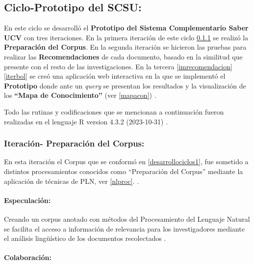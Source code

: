 \documentclass[
  12pt,
  openany]{book}
\begin{document}
\hypertarget{desarrollociclos3}{%
\subsection{Ciclo-Prototipo del SCSU:}\label{desarrollociclos3}}

En este ciclo se desarrolló el \textbf{Prototipo del Sistema Complementario Saber UCV} con tres iteraciones. En la primera iteración de este ciclo \ref{iternlp} se realizó la \textbf{Preparación del Corpus}. En la segunda iteración se hicieron las pruebas para realizar las \textbf{Recomendaciones} de cada documento, basado en la similitud que presente con el resto de las investigaciones. En la tercera \ref{imrecomendacion} \ref{iterbol} se creó una aplicación web interactiva en la que se implementó el \textbf{Prototipo} donde ante un \emph{query} se presentan los resultados y la visualización de los \textbf{``Mapa de Conocimiento''} (ver \ref{mapacon}) .

Todo las rutinas y codificaciones que se mencionan a continuación fueron realizadas en el lenguaje R version 4.3.2 (2023-10-31) \citep{R}.

\hypertarget{iternlp}{%
\subsubsection{Iteración- Preparación del Corpus:}\label{iternlp}}

En esta iteración el Corpus que se conformó en \ref{desarrollociclos1}, fue sometido a distintos procesamientos conocidos como ``Preparación del Corpus'' mediante la aplicación de técnicas de PLN, ver \ref{nlproc}. .

\hypertarget{especulaciuxf3n-4}{%
\paragraph{Especulación:}\label{especulaciuxf3n-4}}

Creando un corpus anotado con métodos del Procesamiento del Lenguaje Natural se facilita el acceso a información de relevancia para los investigadores mediante el análisis lingüístico de los documentos recolectados \citep{article}.

\hypertarget{colaboraciuxf3n-4}{%
\paragraph{Colaboración:}\label{colaboraciuxf3n-4}}
\end{document}
